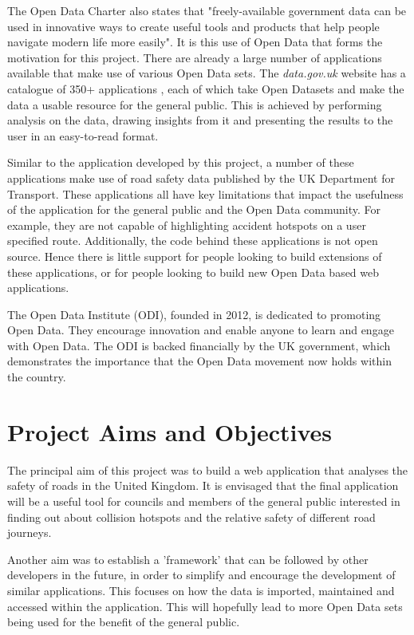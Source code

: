 \documentclass[authoryearcitations]{UoYCSproject}
\begin{document}
The Open Data Charter also states that "freely-available government data can be used in innovative ways to create useful tools and products that help people navigate modern life more easily". It is this use of Open Data that forms the motivation for this project. There are already a large number of applications available that make use of various Open Data sets. The \textit{data.gov.uk} website has a catalogue of 350+ applications \citep{Data.go}, each of which take Open Datasets and make the data a usable resource for the general public. This is achieved by performing analysis on the data, drawing insights from it and presenting the results to the user in an easy-to-read format. 

Similar to the application developed by this project, a number of these applications make use of road safety data published by the UK Department for Transport. These applications all have key limitations that impact the usefulness of the application for the general public and the Open Data community. For example, they are not capable of highlighting accident hotspots on a user specified route. Additionally, the code behind these applications is not open source. Hence there is little support for people looking to build extensions of these applications, or for people looking to build new Open Data based web applications.

The Open Data Institute (ODI), founded in 2012, is dedicated to promoting Open Data. They encourage innovation and enable anyone to learn and engage with Open Data. The ODI is backed financially by the UK government, which demonstrates the importance that the Open Data movement now holds within the country.

\section{Project Aims and Objectives}

The principal aim of this project was to build a web application that analyses the safety of roads in the United Kingdom. It is envisaged that the final application will be a useful tool for councils and members of the general public interested in finding out about collision hotspots and the relative safety of different road journeys.

Another aim was to establish a 'framework' that can be followed by other developers in the future, in order to simplify and encourage the development of similar applications. This focuses on how the data is imported, maintained and accessed within the application. This will hopefully lead to more Open Data sets being used for the benefit of the general public.
\end{document}
